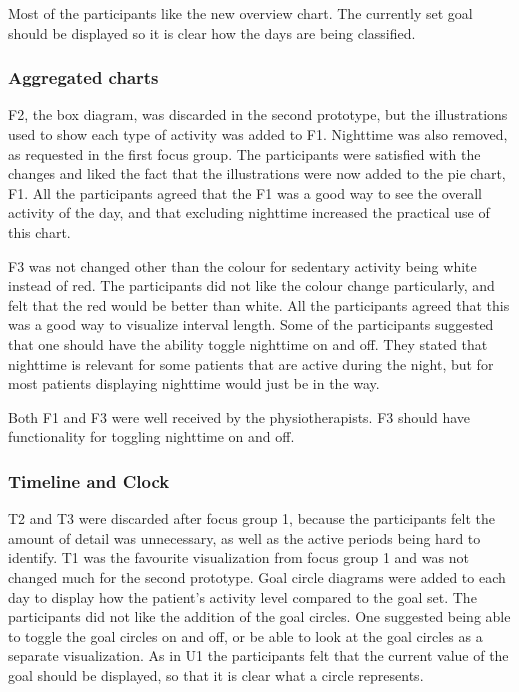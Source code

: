 Most of the participants like the new overview chart. The currently set goal should be displayed so it is clear how the days are being classified.

\subsubsection{Aggregated charts}
F2, the box diagram, was discarded in the second prototype, but the illustrations used to show each type of activity was added to F1. Nighttime was also removed, as requested in the first focus group. The participants were satisfied with the changes and liked the fact that the illustrations were now added to the pie chart, F1. All the participants agreed that the F1 was a good way to see the overall activity of the day, and that excluding nighttime increased the practical use of this chart.

F3 was not changed other than the colour for sedentary activity being white instead of red. The participants did not like the colour change particularly, and felt that the red would be better than white. All the participants agreed that this was a good way to visualize interval length. Some of the participants suggested that one should have the ability toggle nighttime on and off. They stated that nighttime is relevant for some patients that are active during the night, but for most patients displaying nighttime would just be in the way.

Both F1 and F3 were well received by the physiotherapists. F3 should have functionality for toggling nighttime on and off.

\subsubsection{Timeline and Clock}
T2 and T3 were discarded after focus group 1, because the participants felt the amount of detail was unnecessary, as well as the active periods being hard to identify. T1 was the favourite visualization from focus group 1 and was not changed much for the second prototype. Goal circle diagrams were added to each day to display how the patient's activity level compared to the goal set. The participants did not like the addition of the goal circles. One suggested being able to toggle the goal circles on and off, or be able to look at the goal circles as a separate visualization. As in U1 the participants felt that the current value of the goal should be displayed, so that it is clear what a circle represents.

